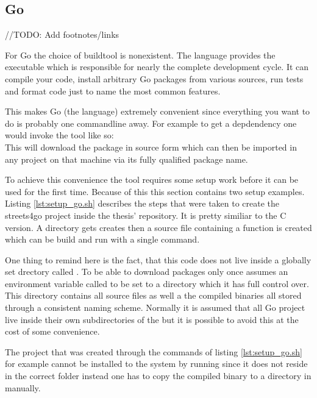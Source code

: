 \subsection{Go}
\label{subsec:Implementation::Setup::Go}

//TODO: Add footnotes/links

For Go the choice of buildtool is nonexistent. The language provides the  executable which is responsible for nearly the complete development cycle. It can compile your code, install arbitrary Go packages from various sources, run tests and format code just to name the most common features.

This makes Go (the language) extremely convenient since everything you want to do is probably one commandline away. For example to get a depdendency one would invoke the tool like so:
\\
This will download the package in source form which can then be imported in any project on that machine via its fully qualified package name.

To achieve this convenience the  tool requires some setup work before it can be used for the first time. Because of this this section contains two setup examples.
\\


Listing \ref{lst:setup_go.sh} describes the steps that were taken to create the streets4go project inside the thesis' repository. It is pretty similiar to the C version. A directory gets creates then a source file containing a  function is created which can be build and run with a single command.

One thing to remind here is the fact, that this code does not live inside a globally set drectory called . To be able to download packages only once  assumes an environment variable called  to be set to a directory which it has full control over. This directory contains all source files as well a the compiled binaries all stored through a consistent naming scheme. Normally it is assumed that all Go project live inside their own subdirectories of the  but it is possible to avoid this at the cost of some convenience.

The project that was created through the commands of listing \ref{lst:setup_go.sh} for example cannot be installed to the system by running  since it does not reside in the correct folder instead one has to copy the compiled binary to a directory in  manually.


